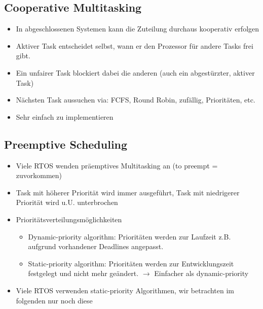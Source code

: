 \subsection{Cooperative Multitasking}
\begin{itemize}
  \item In abgeschlossenen Systemen kann die Zuteilung durchaus kooperativ erfolgen
  \item Aktiver Task entscheidet selbst, wann er den Prozessor für andere Tasks frei gibt.
  \item Ein unfairer Task blockiert dabei die anderen (auch ein abgestürzter, aktiver Task)
  \item Nächsten Task aussuchen via: FCFS, Round Robin, zufällig, Prioritäten, etc.
  \item Sehr einfach zu implementieren
\end{itemize}

\subsection{Preemptive Scheduling}
\begin{itemize}
  \item Viele RTOS wenden präemptives Multitasking an (to preempt = zuvorkommen)
  \item Task mit höherer Priorität wird immer ausgeführt, Task mit niedrigerer Priorität wird u.U. unterbrochen
  \item Prioritätsverteilungsmöglichkeiten
        \begin{itemize}
          \item Dynamic-priority algorithm: Prioritäten werden zur Laufzeit z.B. aufgrund vorhandener Deadlines angepasst.
          \item Static-priority algorithm: Prioritäten werden zur Entwicklungszeit festgelegt und nicht mehr geändert. $\rightarrow$ Einfacher als dynamic-priority
        \end{itemize}
  \item Viele RTOS verwenden static-priority Algorithmen, wir betrachten im folgenden nur noch diese
\end{itemize}

